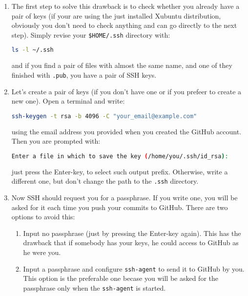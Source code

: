 \begin{enumerate}
\item The first step to solve this drawback is to check whether you
  already have a pair of keys (if your are using the just installed
  Xubuntu distribution, obviously you don't need to check anything and
  can go directly to the next step). Simply revise your
  \texttt{\$HOME/.ssh} directory with:

  \begin{lstlisting}[language=bash]
    ls -l ~/.ssh
  \end{lstlisting}

  and if you find a pair of files with almost the same name, and one
  of they finished with \texttt{.pub}, you have a pair of SSH keys.

\item Let's create a pair of keys (if you don't have one or if you
  prefeer to create a new one). Open a terminal and write:

  \begin{lstlisting}[language=bash]
    ssh-keygen -t rsa -b 4096 -C "your_email@example.com"
  \end{lstlisting}

  using the email address you provided when you created the GitHub
  account. Then you are prompted with:

  \begin{lstlisting}[language=bash]
    Enter a file in which to save the key (/home/you/.ssh/id_rsa):
  \end{lstlisting}

  just press the Enter-key, to select such output prefix. Otherwise,
  write a different one, but don't change the path to the
  \texttt{.ssh} directory.

\item Now SSH should request you for a passphrase. If you write one,
  you will be asked for it each time you push your commits to
  GitHub. There are two options to avoid this:

  \begin{enumerate}
  \item Input no passphrase (just by pressing the Enter-key
    again). This has the drawback that if somebody has your keys, he
    could access to GitHub as he were you.
  \item Input a passphrase and configure \texttt{ssh-agent} to send it
    to GitHub by you. This option is the preferable one becase you
    will be asked for the passphrase only when the \texttt{ssh-agent}
    is started.
  \end{enumerate}


\end{enumerate}
